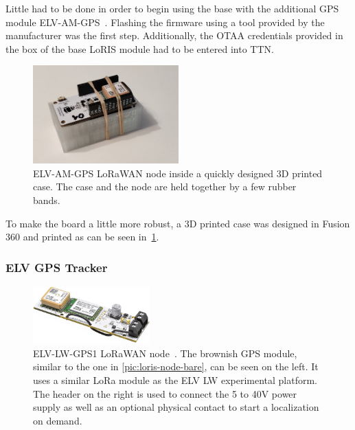 Little had to be done in order to begin using the base with the additional \ac{GPS} module ELV-AM-GPS~\cite{elv_elektronik_ag_elv-track_2022}.
Flashing the firmware using a tool provided by the manufacturer was the first step.
Additionally, the \ac{OTAA} credentials provided in the box of the base LoRIS module had to be entered into \ac{TTN}.

\begin{figure}[htbp]
    \centering
    \includegraphics[width=0.5\textwidth]{pictures/hardware/gps-nodes/loris_with_case.jpg}
    \caption{
        ELV-AM-GPS \ac{LoRaWAN} node inside a quickly designed 3D printed case.
        The case and the node are held together by a few rubber bands.
    }\label{pic:loris-node-with-case}
\end{figure}

To make the board a little more robust, a 3D printed case was designed in Fusion 360 and printed as can be seen in~\cref{pic:loris-node-with-case}.

\subsubsection{ELV \acs{GPS} Tracker}\label{subsubsec:elv-gps-tracker-implementation}

\begin{figure}[htbp]
    \centering
    \includegraphics[width=0.4\textwidth]{pictures/hardware/gps-nodes/ELV-LW-GPS1.jpg}
    \caption{
        ELV-LW-GPS1 \ac{LoRaWAN} node~\protect\cite{elv_elektronik_ag_elv_2023}.
        The brownish \ac{GPS} module, similar to the one in \cref{pic:loris-node-bare}, can be seen on the left.
        It uses a similar \ac{LoRa} module as the ELV LW experimental platform.
        The header on the right is used to connect the 5 to 40V power supply as well as an optional physical contact to start a localization on demand.
    }
\end{figure}

